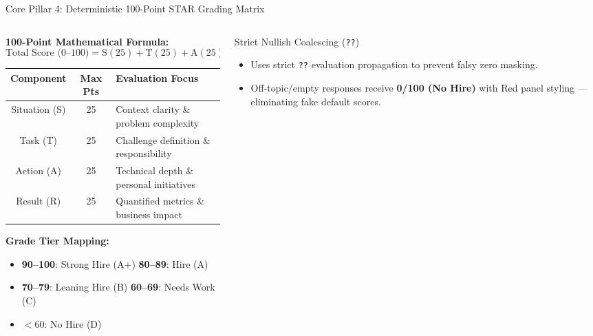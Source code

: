 \documentclass[aspectratio=169, 10pt]{beamer}
\begin{document}
\begin{frame}{Core Pillar 4: Deterministic 100-Point STAR Grading Matrix}
  \begin{columns}
    \begin{column}{0.5\textwidth}
      \textbf{100-Point Mathematical Formula:}
      $$\text{Total Score (0--100)} = \text{S}(25) + \text{T}(25) + \text{A}(25) + \text{R}(25)$$
      
      \vspace{0.2cm}
      \begin{table}
        \tiny
        \begin{tabular}{ccl}
          \toprule
          \textbf{Component} & \textbf{Max Pts} & \textbf{Evaluation Focus} \\
          \midrule
          Situation (S) & 25 & Context clarity \& problem complexity \\
          Task (T)      & 25 & Challenge definition \& responsibility \\
          Action (A)    & 25 & Technical depth \& personal initiatives \\
          Result (R)    & 25 & Quantified metrics \& business impact \\
          \bottomrule
        \end{tabular}
      \end{table}

      \vspace{0.2cm}
      \small
      \textbf{Grade Tier Mapping:}
      \begin{itemize}
        \item \textbf{90--100}: Strong Hire (A+) \quad \textbf{80--89}: Hire (A)
        \item \textbf{70--79}: Leaning Hire (B) \quad \textbf{60--69}: Needs Work (C)
        \item \textbf{$<60$}: No Hire (D)
      \end{itemize}
    \end{column}

    \begin{column}{0.48\textwidth}
      \begin{block}{Strict Nullish Coalescing (\texttt{??})}
        \small
        \begin{itemize}
          \item Uses strict \texttt{??} evaluation propagation to prevent falsy zero masking.
          \item Off-topic/empty responses receive \textbf{0/100 (No Hire)} with Red panel styling — eliminating fake default scores.
        \end{itemize}
      \end{block}


\end{column}
\end{columns}
\end{frame}
\end{document}
